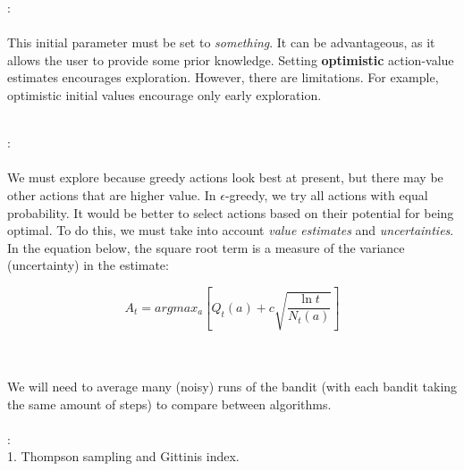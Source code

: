 \documentclass{article} %
\begin{document}
\pagebreak 

:\\\\
This initial parameter must be set to {\it something}. It can be advantageous, as it allows the user to provide some prior knowledge. Setting {\bf optimistic} action-value estimates encourages exploration. However, there are limitations. For example, optimistic initial values encourage only early exploration.\\\


:\\\\
We must explore because greedy actions look best at present, but there may be other actions that are higher value. In $\epsilon$-greedy, we try all actions with equal probability. It would be better to select actions based on their potential for being optimal. To do this, we must take into account {\it value estimates} and {\it uncertainties}. In the equation below, the square root term is a measure of the variance (uncertainty) in the estimate: 

\[A_t = argmax_a[Q_t(a) + c\sqrt{\frac{\ln t}{N_t(a)}}]\]

\\\\
We will need to average many (noisy) runs of the bandit (with each bandit taking the same amount of steps) to compare between algorithms. \\\\


:\\
1. Thompson sampling and Gittinis index.
\end{document}
